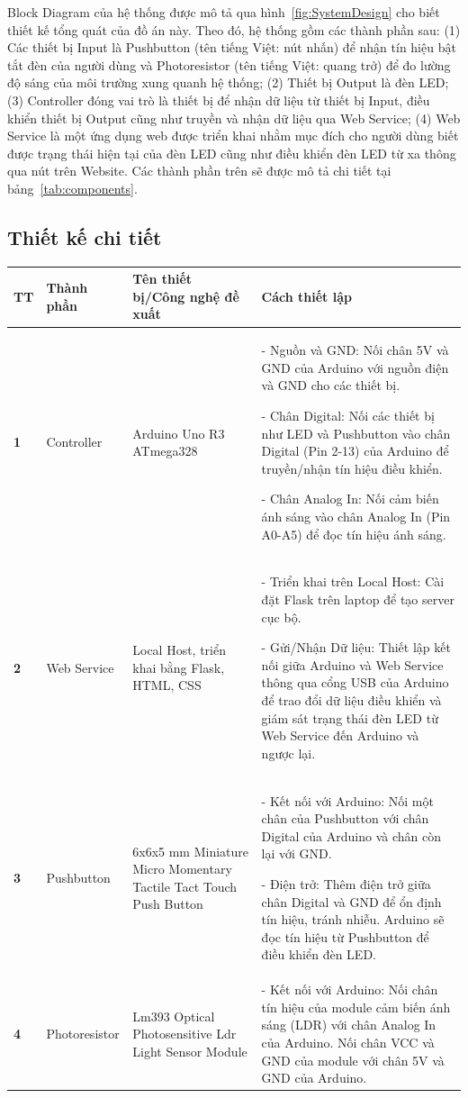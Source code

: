 {Block Diagram của hệ thống được mô tả qua hình~\ref{fig:SystemDesign} cho biết thiết kế tổng quát của đồ án này. Theo đó, hệ thống gồm các thành phần sau: (1) Các thiết bị Input là Pushbutton (tên tiếng Việt: nút nhấn) để nhận tín hiệu bật tắt đèn của người dùng và Photoresistor (tên tiếng Việt: quang trở) để đo lường độ sáng của môi trường xung quanh hệ thống; (2) Thiết bị Output là đèn LED; (3) Controller đóng vai trò là thiết bị để nhận dữ liệu từ thiết bị Input, điều khiển thiết bị Output cũng như truyền và nhận dữ liệu qua Web Service; (4) Web Service là một ứng dụng web được triển khai nhằm mục đích cho người dùng biết được trạng thái hiện tại của đèn LED cũng như điều khiển đèn LED từ xa thông qua nút trên Website. Các thành phần trên sẽ được mô tả chi tiết tại bảng~\ref{tab:components}.

\pagebreak
\subsection{Thiết kế chi tiết}\label{subsec:thiet_ke_chi_tiet}
\begin{table}[!h]
\centering
\small
\begin{tabular}{|p{0.6cm}|p{2.5cm}|p{3.5cm}|p{9cm}|}
\hline
\textbf{TT} & \textbf{Thành phần} & \textbf{Tên thiết bị/Công nghệ đề xuất} & \textbf{Cách thiết lập} \\ \hline
\textbf{1} & Controller & Arduino Uno R3 ATmega328 & 
- Nguồn và GND: Nối chân 5V và GND của Arduino với nguồn điện và GND cho các thiết bị.

- Chân Digital: Nối các thiết bị như LED và Pushbutton vào chân Digital (Pin 2-13) của Arduino để truyền/nhận tín hiệu điều khiển.

- Chân Analog In: Nối cảm biến ánh sáng vào chân Analog In (Pin A0-A5) để đọc tín hiệu ánh sáng.\\ \hline
\textbf{2} & Web Service & Local Host, triển khai bằng Flask, HTML, CSS & 
- Triển khai trên Local Host: Cài đặt Flask trên laptop để tạo server cục bộ.

- Gửi/Nhận Dữ liệu: Thiết lập kết nối giữa Arduino và Web Service thông qua cổng USB của Arduino để trao đổi dữ liệu điều khiển và giám sát trạng thái đèn LED từ Web Service đến Arduino và ngược lại. \\ \hline
\textbf{3} & Pushbutton & 6x6x5 mm Miniature Micro Momentary Tactile Tact Touch Push Button & 
- Kết nối với Arduino: Nối một chân của Pushbutton với chân Digital của Arduino và chân còn lại với GND.

- Điện trở: Thêm điện trở giữa chân Digital và GND để ổn định tín hiệu, tránh nhiễu. Arduino sẽ đọc tín hiệu từ Pushbutton để điều khiển đèn LED.\\ \hline
\textbf{4} & Photoresistor & Lm393 Optical Photosensitive Ldr Light Sensor Module & 
- Kết nối với Arduino: Nối chân tín hiệu của module cảm biến ánh sáng (LDR) với chân Analog In của Arduino. Nối chân VCC và GND của module với chân 5V và GND của Arduino.


\end{tabular}
\end{table}}

